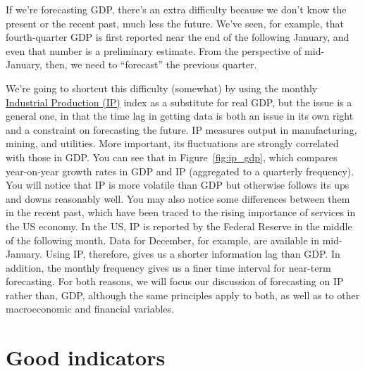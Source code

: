 If we're forecasting GDP, there's an extra difficulty because we don't
know the present or the recent past, much less the future. We've
seen, for example, that fourth-quarter GDP is first reported near
the end of the following January, and even that number is a
preliminary estimate. From the perspective of mid-January, then,
we need to ``forecast'' the previous quarter.


We're going to shortcut this difficulty (somewhat) by using the
monthly \href{http://research.stlouisfed.org/fred2/series/INDPRO?cid=3}{Industrial Production (IP)} index as a substitute for real
GDP, but the issue is a general one, in that the time lag in getting data
is both an issue in its own right and a  constraint on forecasting
the future. IP measures output in manufacturing, mining, and
utilities. More important, its fluctuations are strongly
correlated with those in GDP.  You can see that in
Figure~\ref{fig:ip_gdp}, which compares year-on-year growth rates
in GDP and IP (aggregated to a quarterly frequency). You will
notice that IP is more volatile than GDP but otherwise follows its
ups and downs reasonably well.  You may also notice some
differences between them in the recent past, which have been
traced to the rising importance of services in the US economy.  In
the US, IP is reported by the Federal Reserve in the middle of the
following month.  Data for December, for example, are available in
mid-January.  Using IP, therefore, gives us a shorter information
lag than GDP.  In addition, the monthly frequency gives us a finer
time interval for near-term forecasting.  For both reasons, we
will focus our discussion of forecasting on IP rather than, GDP,
although the same principles apply to both, as well as to other
macroeconomic and financial variables.

\section{Good indicators}

